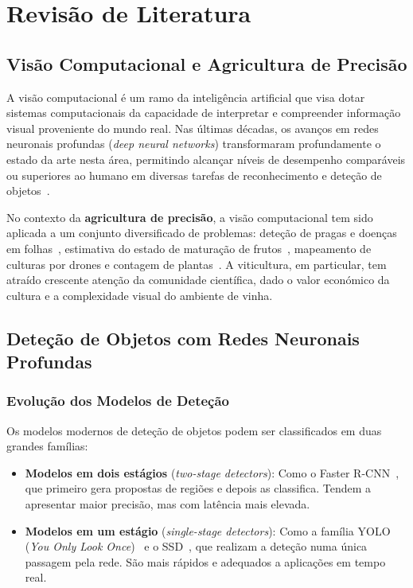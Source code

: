 \chapter{Revisão de Literatura}
\label{chap:revisao}

\section{Visão Computacional e Agricultura de Precisão}

A visão computacional é um ramo da inteligência artificial que visa dotar
sistemas computacionais da capacidade de interpretar e compreender informação
visual proveniente do mundo real. Nas últimas décadas, os avanços em redes
neuronais profundas (\textit{deep neural networks}) transformaram profundamente
o estado da arte nesta área, permitindo alcançar níveis de desempenho
comparáveis ou superiores ao humano em diversas tarefas de reconhecimento e
deteção de objetos~\cite{lecun2015deep}.

No contexto da \textbf{agricultura de precisão}, a visão computacional tem
sido aplicada a um conjunto diversificado de problemas: deteção de pragas e
doenças em folhas~\cite{mohanty2016plant}, estimativa do estado de maturação
de frutos~\cite{sa2016deepfruits}, mapeamento de culturas por drones e
contagem de plantas~\cite{osco2021review}. A viticultura, em particular, tem
atraído crescente atenção da comunidade científica, dado o valor económico da
cultura e a complexidade visual do ambiente de vinha.

\section{Deteção de Objetos com Redes Neuronais Profundas}

\subsection{Evolução dos Modelos de Deteção}

Os modelos modernos de deteção de objetos podem ser classificados em duas
grandes famílias:

\begin{itemize}
  \item \textbf{Modelos em dois estágios} (\textit{two-stage detectors}):
    Como o Faster R-CNN~\cite{ren2015faster}, que primeiro gera propostas de
    regiões e depois as classifica. Tendem a apresentar maior precisão, mas
    com latência mais elevada.

  \item \textbf{Modelos em um estágio} (\textit{single-stage detectors}):
    Como a família YOLO (\textit{You Only Look Once})~\cite{redmon2016you} e
    o SSD~\cite{liu2016ssd}, que realizam a deteção numa única passagem pela
    rede. São mais rápidos e adequados a aplicações em tempo real.
\end{itemize}

